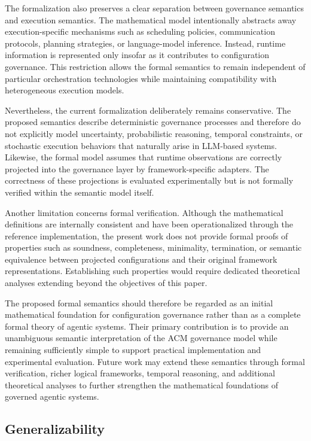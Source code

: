 \documentclass[10pt]{article}
\begin{document}
The formalization also preserves a clear separation between governance semantics and execution semantics. The mathematical model intentionally abstracts away execution-specific mechanisms such as scheduling policies, communication protocols, planning strategies, or language-model inference. Instead, runtime information is represented only insofar as it contributes to configuration governance. This restriction allows the formal semantics to remain independent of particular orchestration technologies while maintaining compatibility with heterogeneous execution models.

Nevertheless, the current formalization deliberately remains conservative. The proposed semantics describe deterministic governance processes and therefore do not explicitly model uncertainty, probabilistic reasoning, temporal constraints, or stochastic execution behaviors that naturally arise in LLM-based systems. Likewise, the formal model assumes that runtime observations are correctly projected into the governance layer by framework-specific adapters. The correctness of these projections is evaluated experimentally but is not formally verified within the semantic model itself.

Another limitation concerns formal verification. Although the mathematical definitions are internally consistent and have been operationalized through the reference implementation, the present work does not provide formal proofs of properties such as soundness, completeness, minimality, termination, or semantic equivalence between projected configurations and their original framework representations. Establishing such properties would require dedicated theoretical analyses extending beyond the objectives of this paper.

The proposed formal semantics should therefore be regarded as an initial mathematical foundation for configuration governance rather than as a complete formal theory of agentic systems. Their primary contribution is to provide an unambiguous semantic interpretation of the ACM governance model while remaining sufficiently simple to support practical implementation and experimental evaluation. Future work may extend these semantics through formal verification, richer logical frameworks, temporal reasoning, and additional theoretical analyses to further strengthen the mathematical foundations of governed agentic systems.

\subsection{Generalizability}
\end{document}
